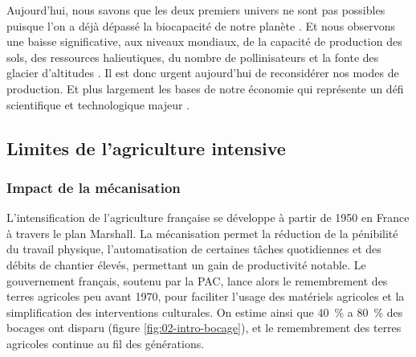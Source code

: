 \documentclass[../thesis.tex]{subfiles}
\begin{document}
    
    \par Aujourd'hui, nous savons que les deux premiers univers ne sont pas possibles puisque l'on a déjà dépassé la biocapacité de notre planète \cite{meadows1972limits, day2017earth}. Et nous observons une baisse significative, aux niveaux mondiaux, de la capacité de production des sols, des ressources halieutiques, du nombre de pollinisateurs et la fonte des glacier d'altitudes \cite{perrier2013anthropocene, Ph-Martin-2017-et-al-JISTEE-1-2017}. Il est donc urgent aujourd'hui de reconsidérer nos modes de production. Et plus largement les bases de notre économie qui représente un défi scientifique et technologique majeur \cite{carles2007volem, aberkane2015economie, jancovici2017avenir}. %
    
    \newpage
    \subsection{Limites de l'agriculture intensive}
    \label{sec:02-limit-of-intensive-agriculture}
    \subsubsection{Impact de la mécanisation}
    
    L'intensification de l'agriculture française se développe à partir de 1950 en France à travers le plan Marshall. La mécanisation permet la réduction de la pénibilité du travail physique, l'automatisation de certaines tâches quotidiennes et des débits de chantier élevés, permettant un gain de productivité notable. Le gouvernement français, soutenu par la PAC, lance alors le remembrement des terres agricoles peu avant 1970, pour faciliter l'usage des matériels agricoles et la simplification des interventions culturales. On estime ainsi que \SI{40}{\percent} a \SI{80}{\percent} des bocages ont disparu (figure \ref{fig:02-intro-bocage}), et le remembrement des terres agricoles continue au fil des générations.
    
\end{document}
